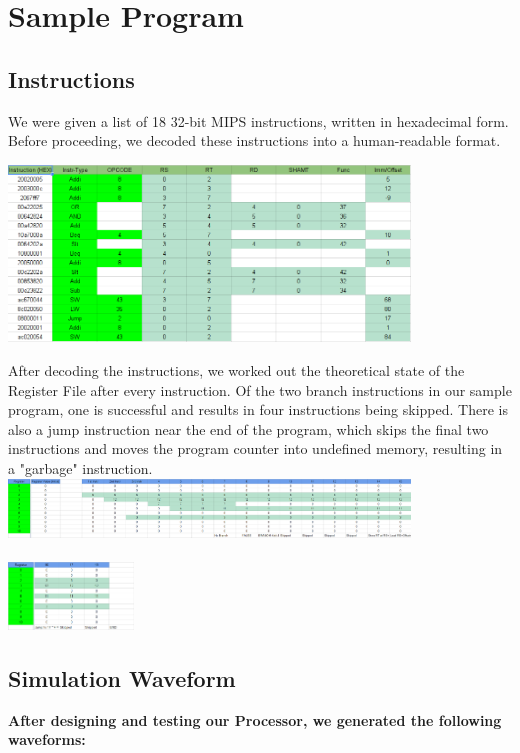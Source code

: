\documentclass{article}
\begin{document}
\section{Sample Program}
\subsection{Instructions}
We were given a list of 18 32-bit MIPS instructions, written in hexadecimal form. Before proceeding, we decoded these instructions into a human-readable format.

\includegraphics[width=0.8\textwidth]{example_program_decoded_instructions.png}

After decoding the instructions, we worked out the theoretical state of the Register File after every instruction. Of the two branch instructions in our sample program, one is successful and results in four instructions being skipped. There is also a jump instruction near the end of the program, which skips the final two instructions and moves the program counter into undefined memory, resulting in a "garbage" instruction. \\


\includegraphics[width=0.8\textwidth]{example_program_registerfile_part1.png} \\ \\
\includegraphics[width=0.25\textwidth]{example_program_registerfile_part2.png} 
	
\subsection{Simulation Waveform}
\bfseries{After designing and testing our Processor, we generated the following waveforms:} \\ \\
\end{document}
